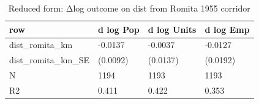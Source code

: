 \begin{table}

\caption{Reduced form: Δlog outcome on dist from Romita 1955 corridor}
\centering
\begin{tabular}[t]{llll}
\toprule
row & d log Pop & d log Units & d log Emp\\
\midrule
dist\_romita\_km & -0.0137 & -0.0037 & -0.0127\\
dist\_romita\_km\_SE & (0.0092) & (0.0137) & (0.0192)\\
N & 1194 & 1193 & 1193\\
R2 & 0.411 & 0.422 & 0.353\\
\bottomrule
\end{tabular}
\end{table}
